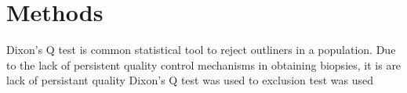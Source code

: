 \chapter{Methods}

Dixon's Q test is common statistical tool to reject outliners in a population. Due to the lack of persistent quality control mechanisms in obtaining biopsies, it is  are lack of persistant quality Dixon's Q test was used to   exclusion test was used 
